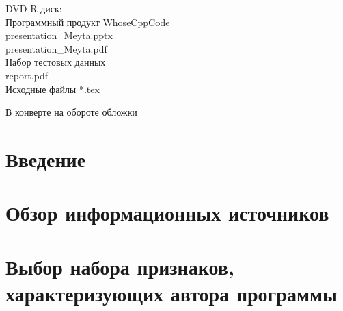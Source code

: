 
 

\newpage
%  
 
 \newpage
%  
 
 
 
 
 \newpage
{}
 \tableofcontents
 
\vspace{1cm}
 
 
\begin{singlespace}
 \begin{minipage}[left]{0.6\linewidth}
 DVD-R диск:\\
 Программный продукт WhoseCppCode\\
 presentation\_Meyta.pptx\\
 presentation\_Meyta.pdf\\
 Набор тестовых данных\\
 report.pdf\\
 Исходные файлы *.tex\\
 \end{minipage}
 \hfill
 \begin{minipage}[right]{0.3\linewidth}
 В конверте на обороте обложки
 \end{minipage}
\end{singlespace}
 

\newpage
\setcounter{section}{0}
\section*{Введение}


% 


\newpage 
\section{Обзор информационных источников }







\newpage 
\section{Выбор набора признаков, характеризующих автора программы}\label{features}
 
 
